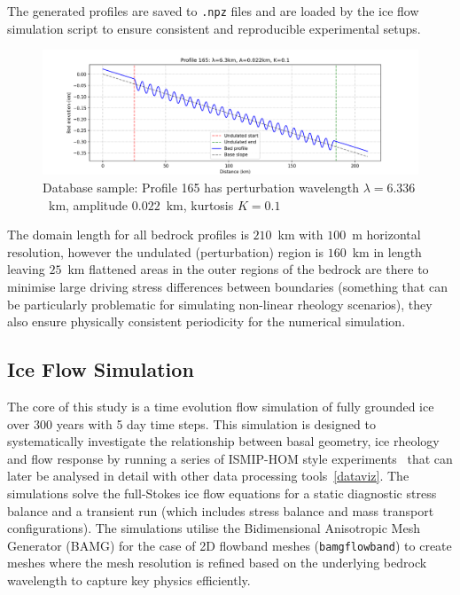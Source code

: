 The generated profiles are saved to \texttt{.npz} files and are loaded by the ice flow simulation script to ensure consistent and reproducible experimental setups.

\begin{figure}[H]
    \includegraphics[scale=0.45]{bedrock_profile_165.png}
    \caption{Database sample: Profile 165 has perturbation wavelength $\lambda=6.336$~km, amplitude $0.022$~km, kurtosis $K=0.1$}
    \label{fig:}
\end{figure}
The domain length for all bedrock profiles is $210$~km with $100$~m horizontal resolution, however the undulated (perturbation) region is $160$~km in length leaving $25$~km flattened areas in the outer regions of the bedrock are there to minimise large driving stress differences between boundaries (something that can be particularly problematic for simulating non-linear rheology scenarios), they also ensure physically consistent periodicity for the numerical simulation.

\subsection{Ice Flow Simulation}

The core of this study is a time evolution flow simulation of fully grounded ice over 300 years with 5 day time steps. This simulation is designed to systematically investigate the relationship between basal geometry, ice rheology and flow response by running a series of ISMIP-HOM style experiments~\cite{Pattyn_2008} that can later be analysed in detail with other data processing tools~\ref{dataviz}. The simulations solve the full-Stokes ice flow equations for a static diagnostic stress balance and a transient run (which includes stress balance and mass transport configurations). The simulations utilise the Bidimensional Anisotropic Mesh Generator (BAMG) for the case of 2D flowband meshes (\texttt{bamgflowband}) to create meshes where the mesh resolution is refined based on the underlying bedrock wavelength to capture key physics efficiently. 

